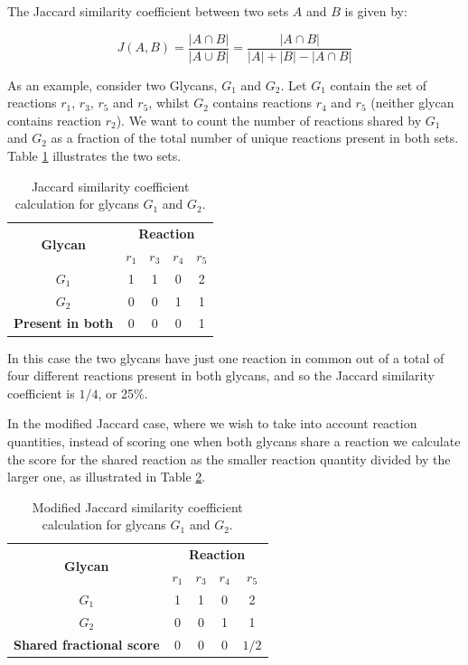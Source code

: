 \documentclass[12pt,a4paper]{article}
\begin{document}
The Jaccard similarity coefficient between two sets $A$ and $B$ is given by:

\begin{equation}
\label{eq:precall}
	J(A,B)=\frac{|A \cap B|}{|A \cup B|}=\frac{|A \cap B|}{|A|+|B|-|A \cap B|}
\end{equation}

As an example, consider two Glycans, $G_1$ and $G_2$. Let $G_1$ contain the set of reactions $r_1$, $r_3$, $r_5$ and $r_5$, whilst $G_2$ contains reactions $r_4$ and $r_5$ (neither glycan contains reaction $r_2$). We want to count the number of reactions shared by $G_1$ and $G_2$ as a fraction of the total number of unique reactions present in both sets. Table \ref{tab:jaccard_set_example} illustrates the two sets.

\begin{table}[h]
\centering
\begin{tabular}{|c|c|c|c|c|} \hline
\multirow{2}{*}{\bf Glycan} & \multicolumn{4}{|c|}{\bf Reaction}\\  \cline{2-5}
& {\bf $r_1$} & {\bf $r_3$} & {\bf $r_4$} & {\bf $r_5$} \\ \hline
$G_1$ & 1 & 1 & 0 & 2 \\ \hline
$G_2$ & 0 & 0 & 1 & 1 \\ \hline
{\bf Present in both} & 0 & 0 & 0 & 1 \\ \hline
\end{tabular}
\caption{Jaccard similarity coefficient calculation for glycans $G_1$ and $G_2$.}
\label{tab:jaccard_set_example}
\end{table}

In this case the two glycans have just one reaction in common out of a total of four different reactions present in both glycans, and so the Jaccard similarity coefficient is $1/4$, or 25\%.

In the modified Jaccard case, where we wish to take into account reaction quantities, instead of scoring one when both glycans share a reaction we calculate the score for the shared reaction as the smaller reaction quantity divided by the larger one, as illustrated in Table \ref{tab:jaccard_list_example}.\\

\begin{table}[h]
\centering
\begin{tabular}{|c|c|c|c|c|} \hline
\multirow{2}{*}{\bf Glycan} & \multicolumn{4}{|c|}{\bf Reaction}\\  \cline{2-5}
& {\bf $r_1$} & {\bf $r_3$} & {\bf $r_4$} & {\bf $r_5$} \\ \hline
$G_1$ & 1 & 1 & 0 & 2 \\ \hline
$G_2$ & 0 & 0 & 1 & 1 \\ \hline
{\bf Shared fractional score} & 0 & 0 & 0 & $1/2$ \\ \hline
\end{tabular}
\caption{Modified Jaccard similarity coefficient calculation for glycans $G_1$ and $G_2$.}
\label{tab:jaccard_list_example}
\end{table}
\end{document}
